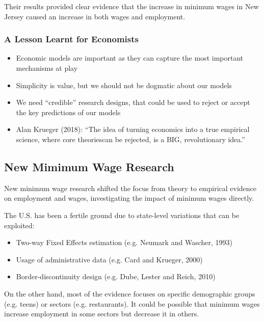             Their results provided clear evidence that the increase in minimum wages in New Jersey caused an increase in both wages and employment.
            
        \subsubsection{A Lesson Learnt for Economists}
            \begin{itemize}
                \item Economic models are important as they can capture the most important mechanisms at play
                \item Simplicity is value, but we should not be dogmatic about our models
                \item We need “credible” research designs, that could be used to reject or accept the key predictions of our models
                \item Alan Krueger (2018): “The idea of turning economics into a true empirical science, where core theoriescan be rejected, is a BIG, revolutionary idea.”
            \end{itemize}
    
    \subsection{New Mimimum Wage Research}
        New minimum wage research shifted the focus from theory to  empirical evidence on employment and wages, investigating the impact of minimum wages directly.
        
        The U.S. has been a fertile ground due to state-level variations that can be exploited:
        \begin{itemize}
            \item Two-way Fixed Effects estimation (e.g. Neumark and Wascher, 1993)
            \item Usage of administrative data (e.g. Card and Krueger, 2000)
            \item Border-discontinuity design (e.g. Dube, Lester and Reich, 2010)
        \end{itemize}
        
        On the other hand, most of the evidence focuses on specific demographic groups (e.g. teens) or sectors (e.g. restaurants). It could be possible that minimum wages increase employment in some sectors but decrease it in others.
        
